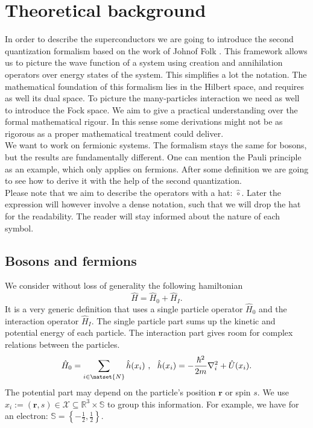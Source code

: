 \documentclass[../main.tex]{subfile}
\begin{document}
\section{Theoretical background}
In order to describe the superconductors we are going to introduce the second quantization formalism based on the work of Johnof Folk \cite{Folk2014}.
This framework allows us to picture the wave function of a system using creation and annihilation operators over
energy states of the system. This simplifies a lot the notation. The mathematical foundation of this formalism lies
in the Hilbert space, and requires as well its dual space. To picture the many-particles interaction we need as well
to introduce the Fock space. We aim to give a practical understanding over the formal mathematical rigour.
In this sense some derivations might not be as rigorous as a proper mathematical treatment could deliver.\\

We want to work on fermionic systems. The formalism stays the same for 
bosons, but the results are fundamentally different. One can mention the Pauli principle as an example, which
only applies on fermions. After some definition we are going to see how to derive it with the help of the second quantization.\\ 

Please note that we aim to describe the operators with a hat: $\hat{\circ}$.
Later the expression will however involve a dense notation, such that we will drop the hat for the readability. The reader will stay
informed about the nature of each symbol. \\

\subsection{Bosons and fermions}
We consider without loss of generality the following hamiltonian
\begin{equation}\label{eq:MasterHamiltonian}
    \hat{H} = \hat{H}_0 + \hat{H}_I.
\end{equation}
It is a very generic definition that uses a single particle operator $\hat{H}_0$ and the interaction operator $\hat{H}_I$. The single 
particle part sums up the kinetic and potential energy of each particle. The interaction part gives room for complex relations
between the particles.
\[
    \hat{H}_0 = \sum_{i\in \natset{N}} \hat{h}(x_i)~,~~ \hat{h}(x_i) = -\frac{\hbar^2}{2m}\nabla_i^2 + \hat{U}(x_i).
\]
The potential part may depend on the particle's position $\bm{r}$ or spin $s$. 
We use $x_i := (\bm{r}, s) \in \mathcal{X}\subseteq\mathbb{R}^{3}\times\mathbb{S}$ to group this information. For example, we have for an electron:
$\mathbb{S}= \left\{-\frac{1}{2},\frac{1}{2}\right\}$.\\
\end{document}
